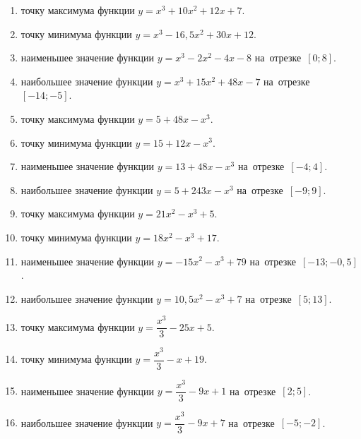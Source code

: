\documentclass[a4paper,10pt]{article}
\begin{document}
\begin{enumerate}
\item {} точку максимума функции $y=x^3 +10x^2+12x+7$.

\item {} точку минимума функции $y=x^3 -16,5x^2+30x+12$.

\item {} наименьшее значение функции $y=x^3 -2x^2-4x-8$ на~отрезке~$\left[0;8\right]$.

\item {} наибольшее значение функции $y=x^3 +15x^2+48x-7$ на~отрезке~$\left[-14;-5\right]$.

\item {} точку максимума функции $y=5+48x-x^3$.

\item {} точку минимума функции $y=15+12x-x^3$.

\item {} наименьшее значение функции $y=13+48x-x^3$ на~отрезке~$\left[-4;4\right]$.

\item {} наибольшее значение функции $y=5+243x-x^3$ на~отрезке~$\left[-9;9\right]$.

\item {} точку максимума функции $y=21x^2-x^3+5$.

\item {} точку минимума функции $y=18x^2-x^3+17$.

\item {} наименьшее значение функции $y=-15x^2-x^3+79$ на~отрезке~$\left[-13;-0,5\right]$.

\item {} наибольшее значение функции $y=10,5x^2-x^3+7$ на~отрезке~$\left[5;13\right]$.

\item {} точку максимума функции $y=\dfrac{x^3}{3} -25x+5$.

\item {} точку минимума функции $y=\dfrac{x^3}{3} -x+19$.

\item {} наименьшее значение функции $y=\dfrac{x^3}{3} -9x+1$ на~отрезке~$\left[2;5\right]$.

\item {} наибольшее значение функции $y=\dfrac{x^3}{3} -9x+7$ на~отрезке~$\left[-5;-2\right]$.


\end{enumerate}
\end{document}

